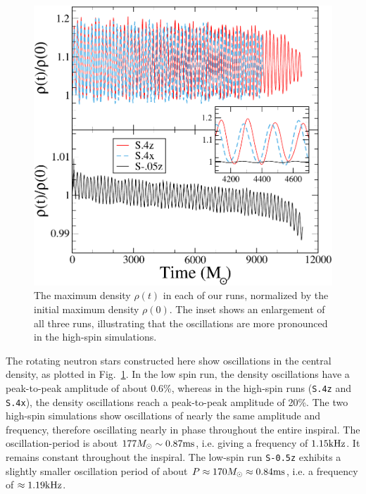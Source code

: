 \begin{figure}
\includegraphics[width=0.95\columnwidth]{chap2/RhoMax}
\caption[The normalized maximum density in each of our runs.]{\label{fig:RhoMax} The maximum density $\rho(t)$ in each of
  our runs, normalized by the initial maximum density $\rho(0)$. The
  inset shows an enlargement of all three runs, illustrating that the
  oscillations are more pronounced in the high-spin simulations. }
\end{figure}

The rotating neutron stars constructed here show oscillations in the
central density, as plotted in Fig.~\ref{fig:RhoMax}. In the low spin
run, the density oscillations have a peak-to-peak amplitude of about
0.6\%, whereas in the high-spin runs ({\tt S.4z} and {\tt S.4x}), the density
oscillations reach a peak-to-peak amplitude of 20\%. The two
high-spin simulations show oscillations of nearly the same amplitude
and frequency, therefore oscillating nearly in phase throughout the
entire inspiral. The oscillation-period is about
$177 M_{\odot} \sim 0.87\rm{ms}$, i.e. giving a frequency of
$1.15{\rm kHz}$. It remains constant throughout the inspiral. The low-spin
run {\tt S-0.5z} exhibits a slightly smaller oscillation period of about
$P\approx 170M_{\odot}\approx 0.84\rm{ms}$, i.e. a frequency of
$\approx 1.19{\rm kHz}$. 


